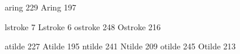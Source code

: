  aring             229
 Aring             197

 lstroke             7
 Lstroke             6
 ostroke           248
 Ostroke           216

 atilde            227
 Atilde            195
 ntilde            241
 Ntilde            209
 otilde            245
 Otilde            213

\stopencoding

\endinput
